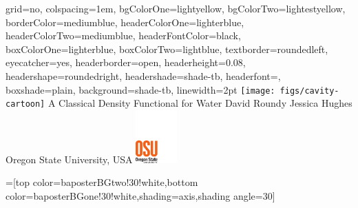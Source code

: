 \documentclass[landscape,a0paper,final,showframe]{baposter}
\begin{document}
\begin{poster}{
  grid=no,
  colspacing=1em,
  bgColorOne=lightyellow,
  bgColorTwo=lightestyellow,
  borderColor=mediumblue,
  headerColorOne=lighterblue,
  headerColorTwo=mediumblue,
  headerFontColor=black,
  boxColorOne=lighterblue,
  boxColorTwo=lightblue,
  textborder=roundedleft,
  eyecatcher=yes,
  headerborder=open,
  headerheight=0.08\textheight,
  headershape=roundedright,
  headershade=shade-tb,
  headerfont=\Large\textsf, %
  boxshade=plain,
  background=shade-tb,
  linewidth=2pt
  }
  { %
    \texttt{[image: figs/cavity-cartoon]}
  }
  {\sf %
  A Classical Density Functional for Water}
  {\sf %
  David Roundy\hspace{3em}
  Jessica Hughes\hspace{3em}
  Oregon State University, USA
  }
  {
    \includegraphics[height=5.5em]{figs/osu-logo}
  }

  =[top color=baposterBGtwo!30!white,bottom color=baposterBGone!30!white,shading=axis,shading angle=30]

     \newlength{\leftimgwidth}
     \setlength{\leftimgwidth}{0.78em+8.0em}

    \newcommand{\colouredcircle}[1]{%
      \tikz{\useasboundingbox (-0.2em,-0.32em) rectangle(0.2em,0.32em); \draw[draw=black,fill=baposterBGone!80!black!#1!white,line width=0.03em] (0,0) circle(0.18em);}}


\end{poster}
\end{document}
